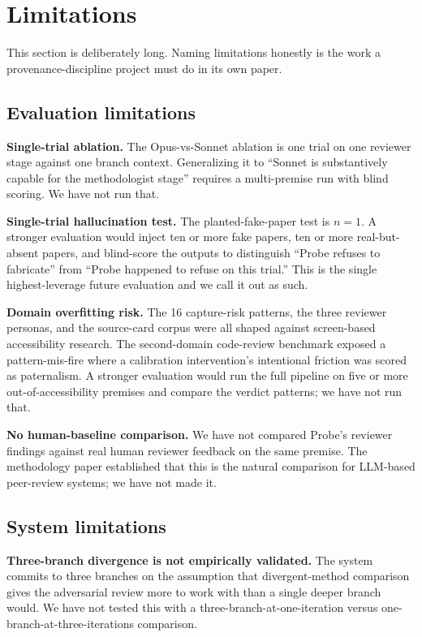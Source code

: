 \section{Limitations}
\label{sec:limitations}

This section is deliberately long. Naming limitations honestly is the work a provenance-discipline project must do in its own paper.

\subsection{Evaluation limitations}

\textbf{Single-trial ablation.} The Opus-vs-Sonnet ablation is one trial on one reviewer stage against one branch context. Generalizing it to ``Sonnet is substantively capable for the methodologist stage'' requires a multi-premise run with blind scoring. We have not run that.

\textbf{Single-trial hallucination test.} The planted-fake-paper test is $n=1$. A stronger evaluation would inject ten or more fake papers, ten or more real-but-absent papers, and blind-score the outputs to distinguish ``Probe refuses to fabricate'' from ``Probe happened to refuse on this trial.'' This is the single highest-leverage future evaluation and we call it out as such.

\textbf{Domain overfitting risk.} The 16 capture-risk patterns, the three reviewer personas, and the source-card corpus were all shaped against screen-based accessibility research. The second-domain code-review benchmark exposed a pattern-mis-fire where a calibration intervention's intentional friction was scored as paternalism. A stronger evaluation would run the full pipeline on five or more out-of-accessibility premises and compare the verdict patterns; we have not run that.

\textbf{No human-baseline comparison.} We have not compared Probe's reviewer findings against real human reviewer feedback on the same premise. The methodology paper \citep{jin2024agentreview} established that this is the natural comparison for LLM-based peer-review systems; we have not made it.

\subsection{System limitations}

\textbf{Three-branch divergence is not empirically validated.} The system commits to three branches on the assumption that divergent-method comparison gives the adversarial review more to work with than a single deeper branch would. We have not tested this with a three-branch-at-one-iteration versus one-branch-at-three-iterations comparison.


